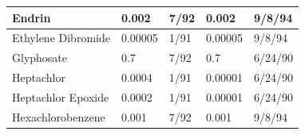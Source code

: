 \begin{table}[]
\begin{tabular}{|l|l|l|l|l|}
Endrin                                                                     & 0.002                                                              & 7/92                                                                                                              & 0.002                                                                                        & 9/8/94                                           \\ \hline
Ethylene   Dibromide                                                       & 0.00005                                                            & 1/91                                                                                                              & 0.00005                                                                                      & 9/8/94                                           \\ \hline
Glyphosate                                                                 & 0.7                                                                & 7/92                                                                                                              & 0.7                                                                                          & 6/24/90                                          \\ \hline
Heptachlor                                                                 & 0.0004                                                             & 1/91                                                                                                              & 0.00001                                                                                      & 6/24/90                                          \\ \hline
Heptachlor   Epoxide                                                       & 0.0002                                                             & 1/91                                                                                                              & 0.00001                                                                                      & 6/24/90                                          \\ \hline
Hexachlorobenzene                                                          & 0.001                                                              & 7/92                                                                                                              & 0.001                                                                                        & 9/8/94                                           \\ \hline

\end{tabular}
\end{table}
